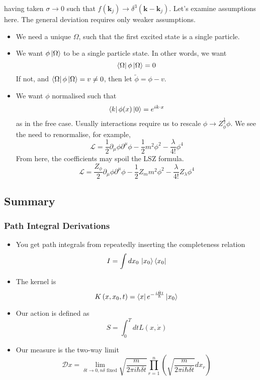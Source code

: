\documentclass[11pt, oneside]{article}   	%
\theoremstyle{slanted}
\newcommand{\planck}{\hbar}
\let\vec\mathbf
\begin{document}
having taken $ \sigma \to 0 $ such that 
$ f \left( \vec{k} _ j  \right)  \to \delta ^ 3 \left( \vec{k} - \vec{k} _ j  \right)  $. 
Let's examine 
assumptions here. 
The general deviation requires 
only weaker assumptions. 

\begin{itemize}
	\item We need a unique $ \Omega $, such that 
		the first excited state is a single particle. 
	\item We want $ \phi \ket{ \Omega }  $ to be a 
		single particle state. In 
		other words, we want 
		\[
		 \bra{ \Omega} \phi \ket{ \Omega}  = 0 
		\] If not, and $ \bra{ \Omega } \phi \ket{ \Omega }  = v \neq 0 $, 
		then let $ \tilde{ \phi }  = \phi  -v   $. 
	\item We want $ \phi $ normalised such that 
		\[
			\bra{ k }\phi ( x )\ket{ 0 }  = e ^{ i k \cdot  x } 
		\] as in the free case. Usually interactions require us 
		to rescale $ \phi \to Z_{ \phi } ^{ \frac{1}{2 } } \phi $.
		We see the need to renormalise, for example, 
		\[
		 \mathcal{ L } = \frac{1}{2 } \partial _ \mu \phi \partial  ^ \mu 
		 \phi  - \frac{1}{2 } m ^ 2 \phi ^ 2  - \frac{\lambda }{ 4 ! } \phi ^ 4 
		\] From here, the coefficients 
		may spoil the LSZ formula. 
		\[
		 \mathcal{ L }  = \frac{Z _ \phi }{ 2 } 
		 \partial  _ \mu \phi \partial  ^ \mu \phi  - \frac{1}{2 } 
		 Z _ m m ^ 2 \phi ^ 2  - \frac{ \lambda }{ 4 ! } Z _ \lambda \phi ^ 4 
		\] 
\end{itemize}


\subsection*{Summary}

\subsubsection{Path Integral Derivations}
\begin{itemize}
	\item You get path integrals from repeatedly inserting 
		the completeness relation 
		\[
		 I = \int dx_0 \, \ket{x_0 }\bra{ x_0 } 
		\]
	\item The kernel is 
		\[
		 K \left( x, x_0 ,t   \right)   = \bra{x}e^{ -\frac{i \hat{H } t }{ \planck}}\ket{ x_0}
		\] 
	\item Our action is defined as 
		\[
			S  = \int_{ 0 } ^ T dt L \left(  x , \dot{ x }  \right) 
		\] 
	\item Our measure is the two-way limit 
		\[
			\mathcal{ D } x  = \lim_{ \delta t \to 0 , n \delta \text{ fixed}} 
			\sqrt{\frac{m}{ 2 \pi i \planck \delta t } }  \prod_{ r  = 1 } ^ n 
			\left( \sqrt{  \frac{m  }{2 \pi i \planck \delta t  }} dx _r  \right) 
		\] 
\end{itemize}
\end{document}
